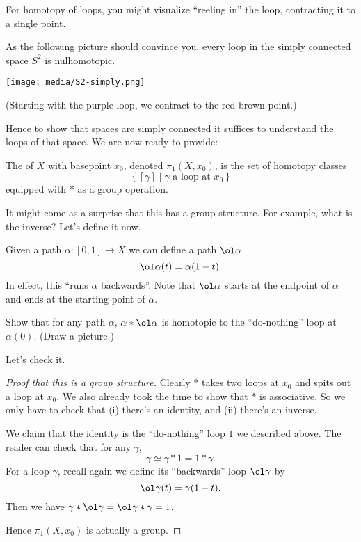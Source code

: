 For homotopy of loops, you might visualize ``reeling in'' the loop, contracting it to a single point.

\begin{example}
	As the following picture should convince you, every loop in
	the simply connected space $S^2$ is nulhomotopic.
	\begin{center}
		\texttt{[image: media/S2-simply.png]}
	\end{center}
	(Starting with the purple loop, we contract to the red-brown point.)
\end{example}

Hence to show that spaces are simply connected it suffices to understand
the loops of that space.
We are now ready to provide:
\begin{definition}
	The  of $X$ with basepoint $x_0$,
	denoted $\pi_1(X, x_0)$, is the set of homotopy classes
	\[ \left\{ [\gamma] \mid \gamma \text{ a loop at $x_0$} \right\} \]
	equipped with $\ast$ as a group operation.
\end{definition}

It might come as a surprise that this has a group structure.
For example, what is the inverse?
Let's define it now.
\begin{definition}
	Given a path $\alpha \colon [0,1] \to X$ we can define a path $\ol\alpha$
	\[ \ol\alpha (t) = \alpha(1-t). \]
	In effect, this ``runs $\alpha$ backwards''.
	Note that $\ol\alpha$ starts at the endpoint of $\alpha$
	and ends at the starting point of $\alpha$.
\end{definition}
\begin{exercise}
	Show that for any path $\alpha$,
	$\alpha \ast \ol\alpha$ is homotopic
	to the ``do-nothing'' loop at $\alpha(0)$.
	(Draw a picture.)
\end{exercise}

Let's check it.
\begin{proof}
	[Proof that this is a group structure]
	Clearly $\ast$ takes two loops at $x_0$ and spits out a loop at $x_0$.
	We also already took the time to show that $\ast$ is associative.
	So we only have to check that (i) there's an identity, and (ii)
	there's an inverse.
	\begin{itemize}
		\ii We claim that the identity is the ``do-nothing'' loop $1$
		we described above. The reader can check that for any $\gamma$,
		\[ \gamma \simeq \gamma \ast 1 = 1 \ast \gamma. \]
		\ii For a loop $\gamma$, recall again we define its ``backwards'' loop $\ol\gamma$ by
		\[ \ol\gamma(t) = \gamma(1-t). \]
		Then we have $\gamma \ast \ol\gamma = \ol\gamma \ast \gamma = 1$.
	\end{itemize}
	Hence $\pi_1(X,x_0)$ is actually a group.
\end{proof}

